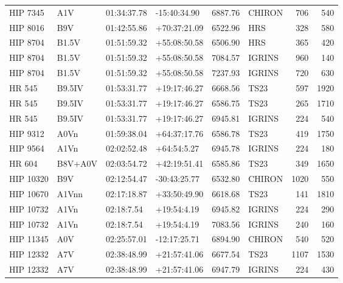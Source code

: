 \documentclass{emulateapj}
\begin{document}
\begin{longtable*}{|l|lllrlrr|}
    HIP 7345 &            A1V &    01:34:37.78 &   -15:40:34.90 &  6887.76 &     CHIRON &      706 &     540 \\
    HIP 8016 &            B9V &    01:42:55.86 &   +70:37:21.09 &  6522.96 &        HRS &      328 &     580 \\
    HIP 8704 &          B1.5V &    01:51:59.32 &   +55:08:50.58 &  6506.90 &        HRS &      365 &     420 \\
    HIP 8704 &          B1.5V &    01:51:59.32 &   +55:08:50.58 &  7084.57 &     IGRINS &      960 &     140 \\
    HIP 8704 &          B1.5V &    01:51:59.32 &   +55:08:50.58 &  7237.93 &     IGRINS &      720 &     630 \\
      HR 545 &         B9.5IV &    01:53:31.77 &   +19:17:46.27 &  6668.56 &       TS23 &      597 &    1920 \\
      HR 545 &         B9.5IV &    01:53:31.77 &   +19:17:46.27 &  6586.75 &       TS23 &      265 &    1710 \\
      HR 545 &         B9.5IV &    01:53:31.77 &   +19:17:46.27 &  6945.81 &     IGRINS &      224 &     540 \\
    HIP 9312 &           A0Vn &    01:59:38.04 &   +64:37:17.76 &  6586.78 &       TS23 &      419 &    1750 \\
    HIP 9564 &           A1Vn &    02:02:52.48 &    +64:54:5.27 &  6945.78 &     IGRINS &      224 &     180 \\
      HR 604 &        B8V+A0V &    02:03:54.72 &   +42:19:51.41 &  6585.86 &       TS23 &      349 &    1650 \\
   HIP 10320 &            B9V &    02:12:54.47 &   -30:43:25.77 &  6532.80 &     CHIRON &     1020 &     550 \\
   HIP 10670 &          A1Vnn &    02:17:18.87 &   +33:50:49.90 &  6618.68 &       TS23 &      141 &    1810 \\
   HIP 10732 &           A1Vn &     02:18:7.54 &    +19:54:4.19 &  6945.82 &     IGRINS &      224 &     290 \\
   HIP 10732 &           A1Vn &     02:18:7.54 &    +19:54:4.19 &  7083.56 &     IGRINS &      240 &     160 \\
   HIP 11345 &            A0V &    02:25:57.01 &   -12:17:25.71 &  6894.90 &     CHIRON &      540 &     520 \\
   HIP 12332 &            A7V &    02:38:48.99 &   +21:57:41.06 &  6677.54 &       TS23 &     1107 &    1530 \\
   HIP 12332 &            A7V &    02:38:48.99 &   +21:57:41.06 &  6947.79 &     IGRINS &      224 &     430 \\

\end{longtable*}
\end{document}
